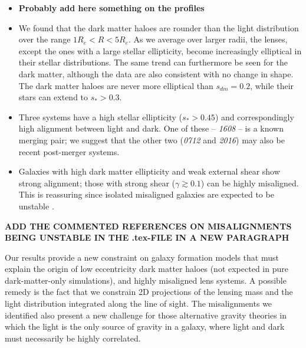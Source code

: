 \documentclass[useAMS,usenatbib]{mn2e}
\begin{document}
\begin{itemize}
\item \textbf{Probably add here something on the profiles}

\item We found that the dark matter haloes are rounder than the light distribution over the range $1R_e < R < 5R_e$. As we average over larger radii, the lenses, except the ones with a large stellar ellipticity, become increasingly elliptical in their stellar distributions. The same trend can furthermore be seen for the dark matter, although the data are also consistent with no change in shape. The dark matter haloes are never more elliptical than $s_{dm} = 0.2$, while their stars can extend to $s_* > 0.3$.

\item Three systems have a high stellar ellipticity ($s_* > 0.45$) and correspondingly high alignment between light and dark. One of these -- {\it1608} -- is a known merging pair; we suggest that the other two ({\it0712} and {\it2016}) may also be recent post-merger systems. 

\item Galaxies with high dark matter ellipticity and weak external shear show strong alignment; those with strong shear ($\gamma \gtrsim 0.1$) can be highly misaligned. This is reassuring since isolated misaligned galaxies are expected to be unstable \citep[e.g.][]{1979ApJ...233..872H,1988A&A...206..269M,2007ApJ...670.1027A,2015arXiv150203429D}.
\end{itemize}

\textbf{ADD THE COMMENTED REFERENCES ON MISALIGNMENTS BEING UNSTABLE IN THE .tex-FILE IN A NEW PARAGRAPH}

Our results provide a new constraint on galaxy formation models that must explain the origin of low eccentricity dark matter haloes (not expected in pure dark-matter-only simulations), and highly misaligned lens systems. A possible remedy is the fact that we constrain 2D projections of the lensing mass and the light distribution integrated along the line of sight. The misalignments we identified also present a new challenge for those alternative gravity theories in which the light is the only source of gravity in a galaxy, where light and dark must necessarily be highly correlated.
\end{document}
